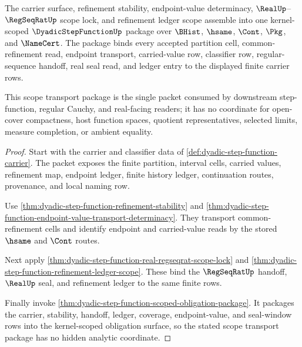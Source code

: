 \begin{theorem}
\label{thm:dyadic-step-function-scope-transport-package}
The carrier surface, refinement stability, endpoint-value determinacy, $\RealUp$--$\RegSeqRatUp$ scope lock, and refinement ledger scope assemble into one kernel-scoped $\DyadicStepFunctionUp$ package over $\BHist$, $\hsame$, $\Cont$, $\Pkg$, and $\NameCert$. The package binds every accepted partition cell, common-refinement read, endpoint transport, carried-value row, classifier row, regular-sequence handoff, real seal read, and ledger entry to the displayed finite carrier rows.

This scope transport package is the single packet consumed by downstream step-function, regular Cauchy, and real-facing readers; it has no coordinate for open-cover compactness, host function spaces, quotient representatives, selected limits, measure completion, or ambient equality.
\end{theorem}
\begin{proof}
Start with the carrier and classifier data of \autoref{def:dyadic-step-function-carrier}. The packet exposes the finite partition, interval cells, carried values, refinement map, endpoint ledger, finite history ledger, continuation routes, provenance, and local naming row.

Use \autoref{thm:dyadic-step-function-refinement-stability} and \autoref{thm:dyadic-step-function-endpoint-value-transport-determinacy}. They transport common-refinement cells and identify endpoint and carried-value reads by the stored $\hsame$ and $\Cont$ routes.

Next apply \autoref{thm:dyadic-step-function-real-regseqrat-scope-lock} and \autoref{thm:dyadic-step-function-refinement-ledger-scope}. These bind the $\RegSeqRatUp$ handoff, $\RealUp$ seal, and refinement ledger to the same finite rows.

Finally invoke \autoref{thm:dyadic-step-function-scoped-obligation-package}. It packages the carrier, stability, handoff, ledger, coverage, endpoint-value, and seal-window rows into the kernel-scoped obligation surface, so the stated scope transport package has no hidden analytic coordinate.
\end{proof}

